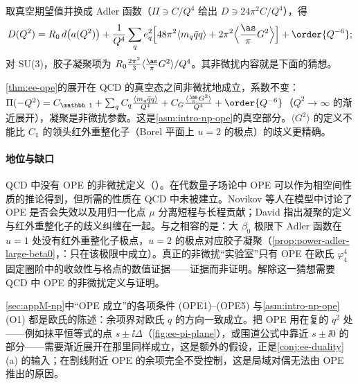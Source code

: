 取真空期望值并换成 Adler 函数（$\Pi\ni C/Q^4$ 给出 $D\ni24\pi^2C/Q^4$），得
\begin{equation}\label{eq:ee-adler-ope}
D(Q^2)=R_0\,d\big(a(Q^2)\big)+\frac{1}{Q^4}\sum_qe_q^2\Big[48\pi^2\langle m_q\bar qq\rangle+2\pi^2\Big\langle\frac{\as}\pi G^2\Big\rangle\Big]+\order{Q^{-6}} ;
\end{equation}
对 SU(3)，胶子凝聚项为 $R_0\frac{2\pi^2}3\langle\frac{\as}\pi G^2\rangle/Q^4$。其非微扰内容就是下面的猜想。

\begin{conjecture}\label{conj:ee-np-ope}
\cref{thm:ee-ope}的展开在 QCD 的真空态之间非微扰地成立，系数不变：$\Pi(-Q^2)=C_{\mathbb 1}+\sum_qC_q\frac{\langle m_q\bar qq\rangle}{Q^4}+C_G\frac{\langle\frac{\as}\pi G^2\rangle}{Q^4}+\order{Q^{-6}}$（$Q^2\to\infty$ 的渐近展开），凝聚是非微扰参数。这是\cref{asm:intro-np-ope}的真空部分。$\langle G^2\rangle$ 的定义不能比 $C_{\mathbb 1}$ 的领头红外重整化子（Borel 平面上 $u=2$ 的极点）的歧义更精确。
\end{conjecture}

\paragraph{地位与缺口}QCD 中没有 OPE 的非微扰定义（\tagC）。在代数量子场论中 OPE 可以作为相空间性质的推论得到\cite{Bostelmann:2005rr}，但所需的性质在 QCD 中未被建立。Novikov 等人在模型中讨论了 OPE 是否会失效以及用归一化点 $\mu$ 分离短程与长程贡献\cite{Novikov:1984rf}；David 指出凝聚的定义与红外重整化子的歧义纠缠在一起\cite{David:1983gz,David:1985xj}。与之相容的是：大 $\beta_0$ 极限下 Adler 函数在 $u=1$ 处没有红外重整化子极点，$u=2$ 的极点对应胶子凝聚（\cref{prop:power-adler-large-beta0}，\tagP：只在该极限中成立）。真正的非微扰“实验室”只有 OPE 在欧氏 $\varphi^4_4$ 固定圈阶中的收敛性\cite{Hollands:2011gf,Holland:2014pna}与格点的数值证据——证据而非证明。解除这一猜想需要 QCD 中 OPE 的非微扰定义与证明。

\begin{remark}\label{rem:ee-complex-ope}
\cref{sec:appM-np}中“OPE 成立”的各项条件 (OPE1)--(OPE5) 与\cref{asm:intro-np-ope}(O1) 都是欧氏的陈述：余项界对欧氏 $q$ 的方向一致成立。把 OPE 用在复的 $q^2$ 处——例如抹平恒等式的点 $s\pm\ii\Delta$（\cref{fig:ee-pi-plane}），或围道公式中靠近 $s\pm\ii0$ 的部分——需要渐近展开在那里同样成立，这是额外的假设，正是\cref{conj:ee-duality}(a) 的输入；在割线附近 OPE 的余项完全不受控制，这是局域对偶无法由 OPE 推出的原因。
\end{remark}

